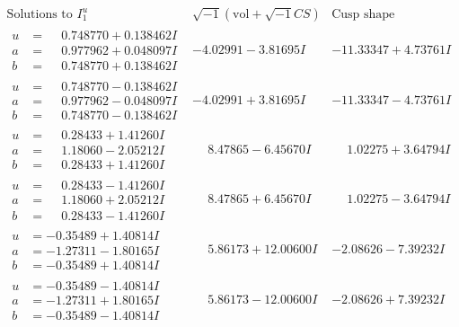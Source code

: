 \documentclass[1p]{elsarticle_modified}
\theoremstyle{definition}
\newcommand{\I}{\sqrt{-1}}
\begin{document}
$$\begin{array}{c|c|c}  
\text{Solutions to }I^u_{1}& \I (\text{vol} + \sqrt{-1}CS) & \text{Cusp shape}\\
 \hline 
\begin{aligned}
u &= \phantom{-}0.748770 + 0.138462 I \\
a &= \phantom{-}0.977962 + 0.048097 I \\
b &= \phantom{-}0.748770 + 0.138462 I\end{aligned}
 & -4.02991 - 3.81695 I & -11.33347 + 4.73761 I \\ \hline\begin{aligned}
u &= \phantom{-}0.748770 - 0.138462 I \\
a &= \phantom{-}0.977962 - 0.048097 I \\
b &= \phantom{-}0.748770 - 0.138462 I\end{aligned}
 & -4.02991 + 3.81695 I & -11.33347 - 4.73761 I \\ \hline\begin{aligned}
u &= \phantom{-}0.28433 + 1.41260 I \\
a &= \phantom{-}1.18060 - 2.05212 I \\
b &= \phantom{-}0.28433 + 1.41260 I\end{aligned}
 & \phantom{-}8.47865 - 6.45670 I & \phantom{-}1.02275 + 3.64794 I \\ \hline\begin{aligned}
u &= \phantom{-}0.28433 - 1.41260 I \\
a &= \phantom{-}1.18060 + 2.05212 I \\
b &= \phantom{-}0.28433 - 1.41260 I\end{aligned}
 & \phantom{-}8.47865 + 6.45670 I & \phantom{-}1.02275 - 3.64794 I \\ \hline\begin{aligned}
u &= -0.35489 + 1.40814 I \\
a &= -1.27311 - 1.80165 I \\
b &= -0.35489 + 1.40814 I\end{aligned}
 & \phantom{-}5.86173 + 12.00600 I & -2.08626 - 7.39232 I \\ \hline\begin{aligned}
u &= -0.35489 - 1.40814 I \\
a &= -1.27311 + 1.80165 I \\
b &= -0.35489 - 1.40814 I\end{aligned}
 & \phantom{-}5.86173 - 12.00600 I & -2.08626 + 7.39232 I \\ \hline\begin{aligned}

\end{aligned}
\end{array}$$
\end{document}

